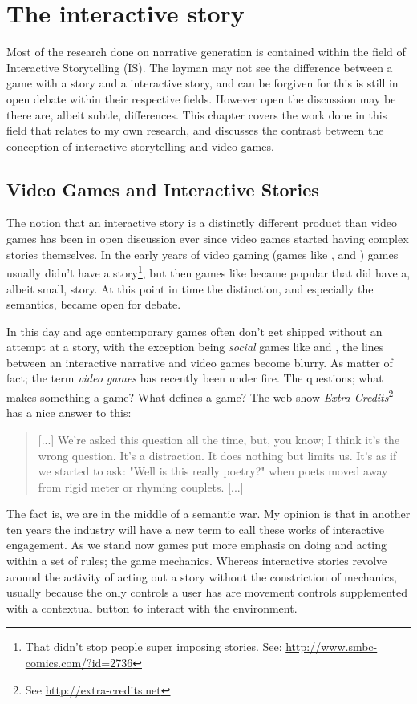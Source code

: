 \chapter{The interactive story}
Most of the research done on narrative generation is contained within the field of Interactive Storytelling (IS). The layman may not see the difference between a game with a story and a interactive story, and can be forgiven for this is still in open debate within their respective fields. However open the discussion may be there are, albeit subtle, differences. This chapter covers the work done in this field that relates to my own research, and discusses the contrast between the conception of interactive storytelling and video games.

\section{Video Games and Interactive Stories}
The notion that an interactive story is a distinctly different product than video games has been in open discussion ever since video games started having complex stories themselves. In the early years of video gaming (games like ,  and ) games usually didn't have a story\footnote{That didn't stop people super imposing stories. See: \url{http://www.smbc-comics.com/?id=2736}}, but then games like  became popular that did have a, albeit small, story. At this point in time the distinction, and especially the semantics, became open for debate.

In this day and age contemporary games often don't get shipped without an attempt at a story, with the exception being \textit{social} games like  and , the lines between an interactive narrative and video games become blurry. As matter of fact; the term \textit{video games} has recently been under fire. The questions; what makes something a game? What defines a game? The web show \textit{Extra Credits}\footnote{See \url{http://extra-credits.net}} has a nice answer to this: 
\begin{quote}
[...] We're asked this question all the time, but, you know; I think it's the wrong question. It's a distraction. It does nothing but limits us. It's as if we started to ask: "Well is this really poetry?" when poets moved away from rigid meter or rhyming couplets. [...]
\end{quote}
The fact is, we are in the middle of a semantic war. My opinion is that in another ten years the industry will have a new term to call these works of interactive engagement. As we stand now games put more emphasis on doing and acting within a set of rules; the game mechanics. Whereas interactive stories revolve around the activity of acting out a story without the constriction of mechanics, usually because the only controls a user has are movement controls supplemented with a contextual button to interact with the environment.
 
